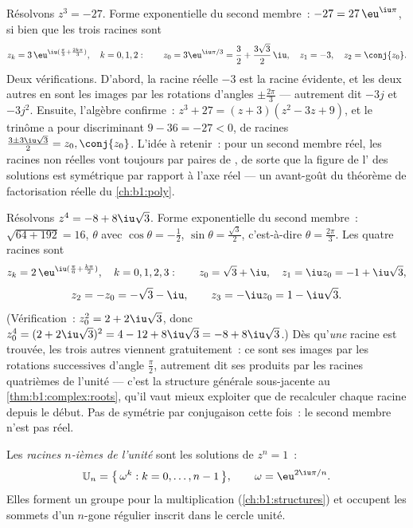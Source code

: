 \begin{example}\label{ex:b1:complex:cuberoots}
Résolvons $z^3 = -27$. Forme exponentielle du second membre~: $-27
= 27\,\eu^{\iu\pi}$, si bien que les trois racines sont
\[
z_k = 3\,\eu^{\iu(\frac\pi3 + \frac{2k\pi}3)}, \quad k = 0, 1, 2 :
\qquad
z_0 = 3\eu^{\iu\pi/3} = \frac32 + \frac{3\sqrt3}2\,\iu,
\quad
z_1 = -3,
\quad
z_2 = \conj{z_0} .
\]
Deux vérifications. D'abord, la racine réelle $-3$ est la racine
évidente, et les deux autres en sont les images par les rotations
d'angles $\pm\frac{2\pi}3$ --- autrement dit $-3j$ et $-3j^2$.
Ensuite, l'algèbre confirme~: $z^3 + 27 = (z + 3)(z^2 - 3z + 9)$,
et le trinôme a pour discriminant $9 - 36 = -27 < 0$, de racines
$\frac{3 \pm 3\iu\sqrt3}2 = z_0, \conj{z_0}$. L'idée à retenir~:
pour un second membre réel, les racines non réelles vont toujours
par paires de , de sorte que la figure de l' des
solutions est symétrique par rapport à l'axe réel --- un avant-goût
du théorème de factorisation réelle du \cref{ch:b1:poly}.
\end{example}

\begin{example}\label{ex:b1:complex:fourthroots}
Résolvons $z^4 = -8 + 8\iu\sqrt3$. Forme exponentielle du second
membre~:  $\sqrt{64 + 192} = 16$,  $\theta$ avec
$\cos\theta = -\frac12$, $\sin\theta = \frac{\sqrt3}2$,
c'est-à-dire $\theta = \frac{2\pi}3$. Les quatre racines sont
\[
z_k = 2\,\eu^{\iu(\frac\pi6 + \frac{k\pi}2)}, \quad k = 0, 1, 2,
3 :
\qquad
z_0 = \sqrt3 + \iu,\quad z_1 = \iu z_0 = -1 + \iu\sqrt3,
\]
\[
z_2 = -z_0 = -\sqrt3 - \iu,\qquad z_3 = -\iu z_0 = 1 - \iu\sqrt3 .
\]
(Vérification~: $z_0^2 = 2 + 2\iu\sqrt3$, donc $z_0^4 = (2 +
2\iu\sqrt3)^2 = 4 - 12 + 8\iu\sqrt3 = -8 + 8\iu\sqrt3$.) Dès
qu'\emph{une} racine est trouvée, les trois autres viennent
gratuitement~: ce sont ses images par les rotations successives
d'angle $\frac\pi2$, autrement dit ses produits par les racines
quatrièmes de l'unité --- c'est la structure générale sous-jacente
au \cref{thm:b1:complex:roots}, qu'il vaut mieux exploiter que de
recalculer chaque racine depuis le début. Pas de symétrie par
conjugaison cette fois~: le second membre n'est pas réel.
\end{example}

\begin{definition}\label{def:b1:complex:unity}
Les \emph{racines $n$-ièmes de l'unité}
sont les solutions de $z^n = 1$~:
\[
\mathbb{U}_n = \bigl\{\, \omega^k : k = 0, \dots, n-1 \,\bigr\},
\qquad \omega = \eu^{2\iu\pi/n}.
\]
Elles forment un groupe pour la multiplication
(\cref{ch:b1:structures}) et occupent les sommets d'un $n$-gone
régulier inscrit dans le cercle unité.
\end{definition}

